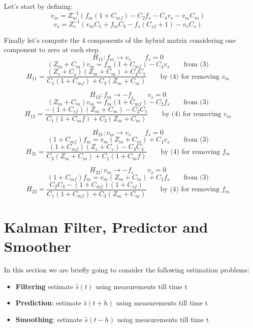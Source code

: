 \documentclass[a4paper,12pt]{article}
\begin{document}
\noindent Let's start by defining:
\begin{equation}
    v_m = Z_{m}^{-1}(f_m(1+C_{mf}) - C_2f_s - C_4v_s-v_mC_m)
\end{equation}
\begin{equation}
    v_s = Z_{s}^{-1}(v_mC_1 + f_mC_3 - f_s(C_{sf}+1) - v_sC_s)
\end{equation}

\noindent Finally let's compute the 4 components of the hybrid matrix considering one component to zero at each step.
\[
    H_{11} : f_m \rightarrow v_s \qquad f_s = 0
    \]\[
    (Z_m + C_m)v_m = f_m(1+C_{mf}) - C_4v_s \qquad \text{from (3)}
\]\[
    H_{11} = \frac{(Z_s+C_s)(Z_m+C_m) +C_4C_1}{C_1(1+C_{mf}) + C_3(Z_m+C_m)}  \qquad \text{by (4) for removing } v_m
\]


\bigskip

\[
    H_{12} : f_m \rightarrow -f_s \qquad v_s = 0
    \]\[
        (Z_m + C_m)v_m = f_m(1+C_{mf}) - C_2f_s \qquad \text{from (3)}
\]\[
    H_{12} = \frac{-(1+C_{sf})(Z_m+C_m) - C_2C_1}{C_1(1+C_mf)+C_3(Z_m+C_m)} \qquad \text{by (4) for removing } v_m
\]

\bigskip

\[
    H_{21} : v_m \rightarrow v_s \qquad f_s = 0
    \]\[
    (1+C_{mf})f_m = v_m(Z_m + C_m) + C_4v_s \qquad \text{from (3)}
\]\[
    H_{21} = \frac{(1+C_{mf})(Z_s + C_s) - C_3C_4}{C_3(Z_m + C_m)+ C_1(1+C_mf)} \qquad \text{by (4) for removing } f_m
\]


\bigskip

\[
    H_{22} : v_m \rightarrow -f_s \qquad v_s = 0
\]\[
    (1+C_{mf})f_m = v_m(Z_m + C_m) + C_2f_s \qquad \text{from (3)}
\]\[
    H_{22} = \frac{C_2C_3 - (1+C_{mf})(1+C_{sf})}{C_1(1+C_{mf}) + C_3(Z_m+C_m)}  \qquad \text{by (4) for  removing } f_m
\]

\section{Kalman Filter, Predictor and Smoother}
In this section we are briefly going to consider the following estimation problems:
\begin{itemize}
    \item \textbf{Filtering} estimate $\hat{s}(t)$ using measurements till time t
    \item \textbf{Prediction}: estimate $\hat{s}(t+h)$ using measurements till time t
    \item \textbf{Smoothing}: estimate $\hat{s}(t-h)$ using measurements till time t
\end{itemize}
\bigskip
\end{document}
